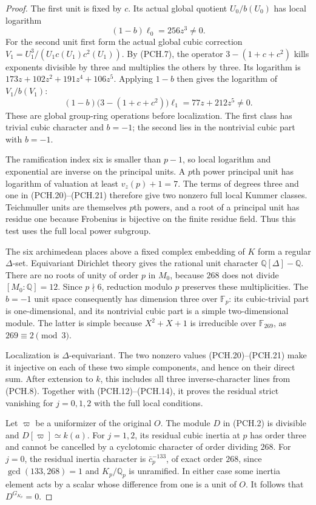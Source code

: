 \begin{proof}
The first unit is fixed by $c$.
Its actual global quotient $U_0/b(U_0)$ has local logarithm
\[
                         (1-b)\ell_0=256z^3\ne0.
 \tag{PCH.20}
\]
For the second unit first form the actual global cubic correction
$V_1=U_1^3/(U_1c(U_1)c^2(U_1))$.
By (PCH.7), the operator $3-(1+c+c^2)$ kills exponents divisible
by three and multiplies the others by three.
Its logarithm is $173z+102z^2+191z^4+106z^5$.
Applying $1-b$ then gives the logarithm of $V_1/b(V_1)$:
\[
                (1-b)\bigl(3-(1+c+c^2)\bigr)\ell_1
                             =77z+212z^5\ne0.
 \tag{PCH.21}
\]
These are global group-ring operations before localization.
The first class has trivial cubic character and $b=-1$;
the second lies in the nontrivial cubic part with $b=-1$.

The ramification index six is smaller than $p-1$, so local
logarithm and exponential are inverse on the principal units.
A $p$th power principal unit has logarithm of valuation at least
$v_z(p)+1=7$.
The terms of degrees three and one in (PCH.20)--(PCH.21)
therefore give two nonzero full local Kummer classes.
Teichmuller units are themselves $p$th powers, and a root of a
principal unit has residue one because Frobenius is bijective
on the finite residue field.
Thus this test uses the full local power subgroup.

The six archimedean places above a fixed complex embedding of $K$
form a regular $\Delta$-set.
Equivariant Dirichlet theory gives the rational unit character
$\mathbb Q[\Delta]-\mathbb Q$.
There are no roots of unity of order $p$ in $M_0$, because
$268$ does not divide $[M_0:\mathbb Q]=12$.
Since $p\nmid6$, reduction modulo $p$ preserves these multiplicities.
The $b=-1$ unit space consequently has dimension three over
$\mathbb F_p$: its cubic-trivial part is one-dimensional, and its
nontrivial cubic part is a simple two-dimensional module.
The latter is simple because $X^2+X+1$ is irreducible over
$\mathbb F_{269}$, as $269\equiv2\pmod3$.

Localization is $\Delta$-equivariant.
The two nonzero values (PCH.20)--(PCH.21) make it injective on
each of these two simple components, and hence on their direct sum.
After extension to $k$, this includes all three inverse-character
lines from (PCH.8).
Together with (PCH.12)--(PCH.14), it proves the residual strict
vanishing for $j=0,1,2$ with the full local conditions.

Let $\varpi$ be a uniformizer of the original $O$.
The module $D$ in (PCH.2) is divisible and $D[\varpi]\simeq k(a)$.
For $j=1,2$, its residual cubic inertia at $p$ has order three
and cannot be cancelled by a cyclotomic character of order dividing
$268$.  For $j=0$, the residual inertia character is
$\bar c_p^{-133}$, of exact order $268$, since
$\gcd(133,268)=1$ and $K_p/\mathbb Q_p$ is unramified.
In either case some inertia element acts by a scalar whose
difference from one is a unit of $O$.
It follows that $D^{G_{K_p}}=0$.


\end{proof}
